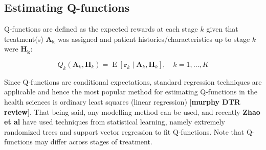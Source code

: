 \documentclass[12pt]{article}
\begin{document}

\subsection{Estimating Q-functions} %
\label{sub:estimating_q_functions}

Q-functions are defined as the expected rewards at each stage $k$ given that treatment(s) $\bm{A_{k}}$ was assigned and patient histories/characteristics up to stage $k$ were $\bm{H_{k}}$:

\begin{equation}
   Q_{k}(\bm{A}_{k}, \bm{H}_{k})  = \operatorname{E}[\bm{r}_{k} \mid \bm{A}_{k}, \bm{H}_{k}], \quad k = 1, \ldots, K
\end{equation}

Since Q-functions are conditional expectations, standard regression techniques are applicable and hence the most popular method for estimating Q-functions in the health sciences is ordinary least squares (linear regression) [\textbf{murphy DTR review}].
%
That being said, any modelling method can be used, and recently \textbf{Zhao et al} have used techniques from statistical learning, namely extremely randomized trees and support vector regression to fit Q-functions. Note that Q-functions may differ across stages of treatment.
\end{document}
